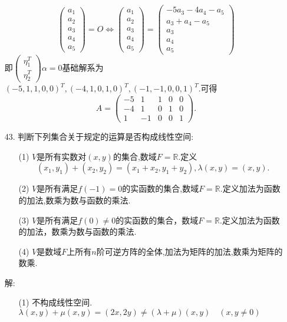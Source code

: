 \documentclass{article}
\begin{document}
\begin{enumerate}
\[\begin{pmatrix}
            a_1\\ a_2\\ a_3\\ a_4\\ a_5
        \end{pmatrix}=O
        \Leftrightarrow
        \begin{pmatrix}
            a_1\\ a_2\\ a_3\\ a_4\\ a_5
        \end{pmatrix}=
        \begin{pmatrix}
            -5a_3-4a_4-a_5 \\ a_3+a_4-a_5 \\ a_3 \\ a_4 \\ a_5
        \end{pmatrix}
    \]
    即$\begin{pmatrix}\eta_1 ^T\\\eta_2 ^T\end{pmatrix} \alpha=0$基础解系为${(-5,1,1,0,0)}^T,{(-4,1,0,1,0)}^T,{(-1,-1,0,0,1)}^T$.可得
    \[
        A=\begin{pmatrix}
            -5 & 1 & 1 & 0 & 0\\
            -4 & 1 & 0 & 1 & 0\\
            1 & -1 & 0 & 0 & 1
        \end{pmatrix}.
    \]
    \item [43.]判断下列集合关于规定的运算是否构成线性空间:
    \begin{enumerate}
        \item [(1)]$V$是所有实数对$(x,y)$的集合,数域$F=\mathbb{R}$.定义\[(x_1,y_1)+ (x_2,y_2)= (x_1+x_2,y_1 + y_2), \lambda(x,y)= (x,y).\]
        \item [(2)]$V$是所有满足$f(-1)=0$的实函数的集合,数域$F=\mathbb{R}$.定义加法为函数的加法,数乘为数与函数的乘法.
        \item [(3)]$V$是所有满足$f(0)\neq 0$的实函数的集合，数域$F=\mathbb{R}$.定义加法为函数的加法，数乘为数与函数的乘法.
        \item [(4)]$V$是数域$F$上所有$n$阶可逆方阵的全体,加法为矩阵的加法,数乘为矩阵的数乘.
    \end{enumerate}
    解:
    \begin{enumerate}
        \item [(1)]不构成线性空间.$\lambda (x,y)+\mu (x,y)=(2x,2y)\neq (\lambda+\mu)(x,y)\quad(x,y\neq 0)$

\end{enumerate}
\end{enumerate}
\end{document}
